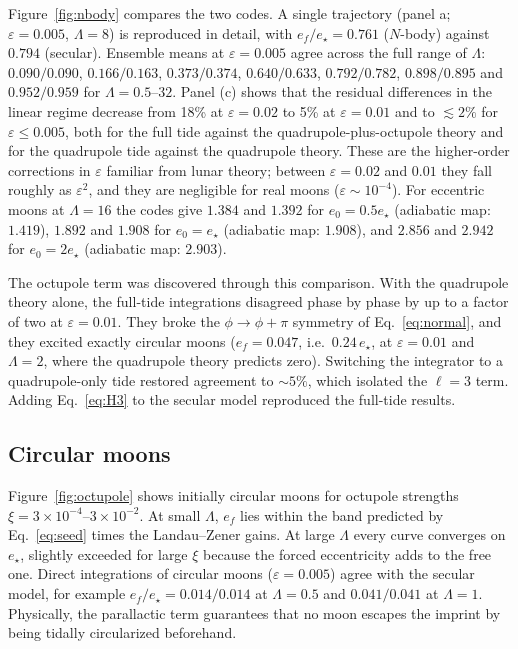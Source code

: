 \documentclass[11pt,a4paper]{article}
\newcommand{\estar}{e_\star}
\newcommand{\eps}{\varepsilon}
\begin{document}
Figure~\ref{fig:nbody} compares the two codes. A single trajectory (panel a; $\eps=0.005$, $\Lambda=8$) is reproduced in detail, with $e_f/\estar=0.761$ ($N$-body) against $0.794$ (secular). Ensemble means at $\eps=0.005$ agree across the full range of $\Lambda$: $0.090/0.090$, $0.166/0.163$, $0.373/0.374$, $0.640/0.633$, $0.792/0.782$, $0.898/0.895$ and $0.952/0.959$ for $\Lambda=0.5$--$32$. Panel (c) shows that the residual differences in the linear regime decrease from 18\% at $\eps=0.02$ to 5\% at $\eps=0.01$ and to $\lesssim2\%$ for $\eps\le0.005$, both for the full tide against the quadrupole-plus-octupole theory and for the quadrupole tide against the quadrupole theory. These are the higher-order corrections in $\eps$ familiar from lunar theory; between $\eps=0.02$ and $0.01$ they fall roughly as $\eps^2$, and they are negligible for real moons ($\eps\sim10^{-4}$). For eccentric moons at $\Lambda=16$ the codes give $1.384$ and $1.392$ for $e_0=0.5\estar$ (adiabatic map: $1.419$), $1.892$ and $1.908$ for $e_0=\estar$ (adiabatic map: $1.908$), and $2.856$ and $2.942$ for $e_0=2\estar$ (adiabatic map: $2.903$).

The octupole term was discovered through this comparison. With the quadrupole theory alone, the full-tide integrations disagreed phase by phase by up to a factor of two at $\eps=0.01$. They broke the $\phi\to\phi+\pi$ symmetry of Eq.~\eqref{eq:normal}, and they excited exactly circular moons ($e_f=0.047$, i.e.\ $0.24\,\estar$, at $\eps=0.01$ and $\Lambda=2$, where the quadrupole theory predicts zero). Switching the integrator to a quadrupole-only tide restored agreement to $\sim5\%$, which isolated the $\ell=3$ term. Adding Eq.~\eqref{eq:H3} to the secular model reproduced the full-tide results.

\subsection{Circular moons}

Figure~\ref{fig:octupole} shows initially circular moons for octupole strengths $\xi=3\times10^{-4}$--$3\times10^{-2}$. At small $\Lambda$, $e_f$ lies within the band predicted by Eq.~\eqref{eq:seed} times the Landau--Zener gains. At large $\Lambda$ every curve converges on $\estar$, slightly exceeded for large $\xi$ because the forced eccentricity adds to the free one. Direct integrations of circular moons ($\eps=0.005$) agree with the secular model, for example $e_f/\estar=0.014/0.014$ at $\Lambda=0.5$ and $0.041/0.041$ at $\Lambda=1$. Physically, the parallactic term guarantees that no moon escapes the imprint by being tidally circularized beforehand.
\end{document}
